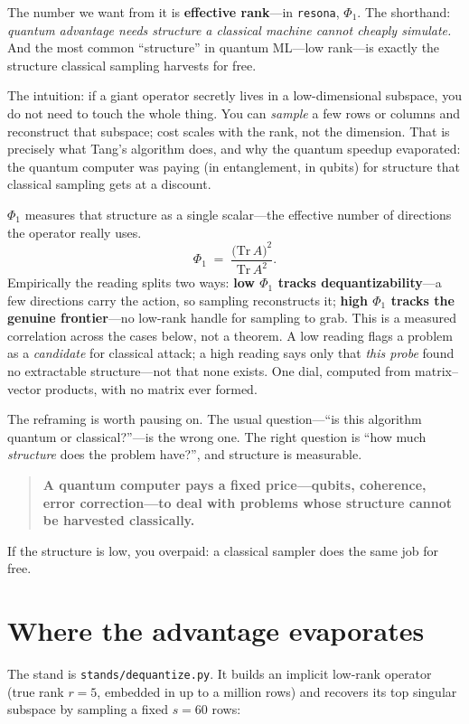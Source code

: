 \documentclass[11pt]{article}
\newcommand{\Phione}{$\Phi_1$}
\begin{document}
The number we want from it is \textbf{effective rank}---in \texttt{resona},
\Phione. The shorthand: \emph{quantum advantage needs structure a classical machine
cannot cheaply simulate.} And the most common ``structure'' in quantum ML---low
rank---is exactly the structure classical sampling harvests for free.

The intuition: if a giant operator secretly lives in a low-dimensional subspace,
you do not need to touch the whole thing. You can \emph{sample} a few rows or
columns and reconstruct that subspace; cost scales with the rank, not the
dimension. That is precisely what Tang's algorithm does, and why the quantum
speedup evaporated: the quantum computer was paying (in entanglement, in qubits)
for structure that classical sampling gets at a discount.

\Phione{} measures that structure as a single scalar---the effective number of
directions the operator really uses.
\[
  \Phi_1 \;=\; \frac{\big(\mathrm{Tr}\,A\big)^2}{\mathrm{Tr}\,A^2}.
\]
Empirically the reading splits two ways: \textbf{low \Phione{} tracks
dequantizability}---a few directions carry the action, so sampling reconstructs
it; \textbf{high \Phione{} tracks the genuine frontier}---no low-rank handle for
sampling to grab. This is a measured correlation across the cases below, not a
theorem. A low reading flags a problem as a \emph{candidate} for classical attack;
a high reading says only that \emph{this probe} found no extractable
structure---not that none exists. One dial, computed from matrix--vector products,
with no matrix ever formed.

The reframing is worth pausing on. The usual question---``is this algorithm quantum
or classical?''---is the wrong one. The right question is ``how much
\emph{structure} does the problem have?'', and structure is measurable.

\begin{quote}
\textbf{A quantum computer pays a fixed price---qubits, coherence, error
correction---to deal with problems whose structure cannot be harvested
classically.}
\end{quote}

\noindent If the structure is low, you overpaid: a classical sampler does the same
job for free.

\section*{Where the advantage evaporates}

The stand is \texttt{stands/dequantize.py}. It builds an implicit low-rank operator
(true rank $r=5$, embedded in up to a million rows) and recovers its top singular
subspace by sampling a fixed $s=60$ rows:
\end{document}
